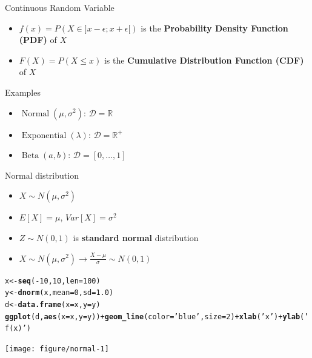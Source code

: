 \documentclass{beamer}\usepackage[]{graphicx}\usepackage[]{color}
\makeatletter
\newcommand{\hlnum}[1]{\textcolor[rgb]{0.686,0.059,0.569}{#1}}%
\newcommand{\hlstr}[1]{\textcolor[rgb]{0.192,0.494,0.8}{#1}}%
\newcommand{\hlopt}[1]{\textcolor[rgb]{0,0,0}{#1}}%
\newcommand{\hlstd}[1]{\textcolor[rgb]{0.345,0.345,0.345}{#1}}%
\newcommand{\hlkwb}[1]{\textcolor[rgb]{0.69,0.353,0.396}{#1}}%
\newcommand{\hlkwc}[1]{\textcolor[rgb]{0.333,0.667,0.333}{#1}}%
\newcommand{\hlkwd}[1]{\textcolor[rgb]{0.737,0.353,0.396}{\textbf{#1}}}%
\newenvironment{kframe}{%
 \def\at@end@of@kframe{}%
 \ifinner\ifhmode%
  \def\at@end@of@kframe{\end{minipage}}%
  \begin{minipage}{\columnwidth}%
 \fi\fi%
 \def\FrameCommand##1{\hskip\@totalleftmargin \hskip-\fboxsep
 \colorbox{shadecolor}{##1}\hskip-\fboxsep
     \hskip-\linewidth \hskip-\@totalleftmargin \hskip\columnwidth}%
 \MakeFramed {\advance\hsize-\width
   \@totalleftmargin\z@ \linewidth\hsize
   \@setminipage}}%
 {\par\unskip\endMakeFramed%
 \at@end@of@kframe}
\newenvironment{knitrout}{}{} %
\makeatother
\begin{document}
\begin{frame}{Continuous Random Variable}
  \begin{itemize}
    \item $f(x) = P(X \in ]x-\epsilon;x+\epsilon[)$ is the \textbf{Probability Density Function (PDF)} of $X$
    \item $F(X) = P(X\le x)$ is the \textbf{Cumulative Distribution Function (CDF)} of $X$
  \end{itemize}
  \begin{exampleblock}{Examples}
    \begin{itemize}
      \item $\operatorname{Normal}(\mu, \sigma^2)$: $\mathcal{D} = \mathbb{R}$ 
      \item $\operatorname{Exponential}(\lambda)$: $\mathcal{D} = \mathbb{R}^+$
      \item $\operatorname{Beta}(a, b)$: $\mathcal{D} = [0, \dots, 1]$
    \end{itemize}
  \end{exampleblock}
\end{frame}

\begin{frame}[fragile]{Normal distribution}
  \begin{itemize}
    \item $X \sim N(\mu, \sigma^2)$
    \item $E[X]=\mu$, $Var[X]=\sigma^2$
    \item $Z \sim N(0, 1)$ is \textbf{standard normal} distribution
    \item $X \sim N(\mu, \sigma^2) \rightarrow \frac{X-\mu}{\sigma} \sim N(0,1)$
  \end{itemize}
\begin{knitrout}\tiny
{}\color{fgcolor}\begin{kframe}
\begin{alltt}
\hlstd{x} \hlkwb{<-} \hlkwd{seq}\hlstd{(}\hlopt{-}\hlnum{10}\hlstd{,} \hlnum{10}\hlstd{,} \hlkwc{len}\hlstd{=}\hlnum{100}\hlstd{)}
\hlstd{y} \hlkwb{<-} \hlkwd{dnorm}\hlstd{(x,} \hlkwc{mean}\hlstd{=}\hlnum{0}\hlstd{,} \hlkwc{sd}\hlstd{=}\hlnum{1.0}\hlstd{)}
\hlstd{d} \hlkwb{<-} \hlkwd{data.frame}\hlstd{(}\hlkwc{x}\hlstd{=x,} \hlkwc{y}\hlstd{=y)}
\hlkwd{ggplot}\hlstd{(d,} \hlkwd{aes}\hlstd{(}\hlkwc{x}\hlstd{=x,} \hlkwc{y}\hlstd{=y))} \hlopt{+} \hlkwd{geom_line}\hlstd{(}\hlkwc{color}\hlstd{=}\hlstr{'blue'}\hlstd{,} \hlkwc{size}\hlstd{=}\hlnum{2}\hlstd{)} \hlopt{+} \hlkwd{xlab}\hlstd{(}\hlstr{'x'}\hlstd{)} \hlopt{+} \hlkwd{ylab}\hlstd{(}\hlstr{'f(x)'}\hlstd{)}
\end{alltt}
\end{kframe}

{\centering \texttt{[image: figure/normal-1]} 

}



\end{knitrout}
\end{frame}
\end{document}
